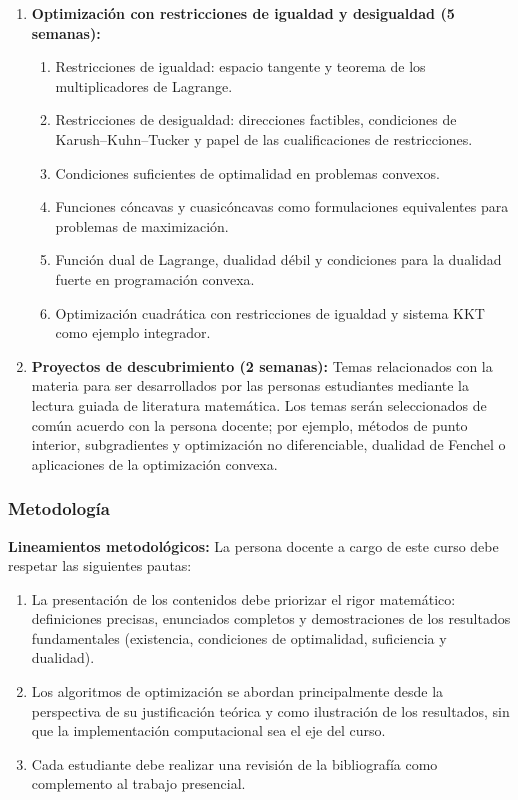 \begin{refsection}
\begin{enumerate}
\item \textbf{Optimización con restricciones de igualdad y desigualdad (5 semanas):}
\begin{enumerate}
    \item Restricciones de igualdad: espacio tangente y teorema de los multiplicadores de Lagrange.
    \item Restricciones de desigualdad: direcciones factibles, condiciones de Karush--Kuhn--Tucker y papel de las cualificaciones de restricciones.
    \item Condiciones suficientes de optimalidad en problemas convexos.
    \item Funciones cóncavas y cuasicóncavas como formulaciones equivalentes para problemas de maximización.
    \item Función dual de Lagrange, dualidad débil y condiciones para la dualidad fuerte en programación convexa.
    \item Optimización cuadrática con restricciones de igualdad y sistema KKT como ejemplo integrador.
\end{enumerate}

\item \textbf{Proyectos de descubrimiento (2 semanas):}
Temas relacionados con la materia para ser desarrollados por las personas estudiantes mediante la lectura guiada de literatura matemática. Los temas serán seleccionados de común acuerdo con la persona docente; por ejemplo, métodos de punto interior, subgradientes y optimización no diferenciable, dualidad de Fenchel o aplicaciones de la optimización convexa.

\end{enumerate}

\subsubsection*{Metodología}

\noindent \textbf{Lineamientos metodológicos:} La persona docente a cargo de este curso debe respetar las siguientes pautas:
\begin{enumerate}
    \item La presentación de los contenidos debe priorizar el rigor matemático: definiciones precisas, enunciados completos y demostraciones de los resultados fundamentales (existencia, condiciones de optimalidad, suficiencia y dualidad).
    \item Los algoritmos de optimización se abordan principalmente desde la perspectiva de su justificación teórica y como ilustración de los resultados, sin que la implementación computacional sea el eje del curso.
    \item Cada estudiante debe realizar una revisión de la bibliografía como complemento al trabajo presencial.
\end{enumerate}


\end{refsection}
